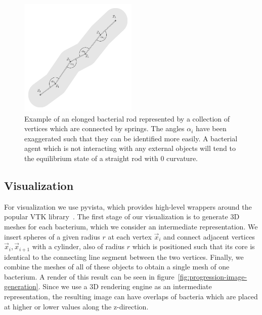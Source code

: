 \documentclass{article}
\begin{document}

\begin{figure}[H]
    \centering
    \includegraphics[width=0.5\textwidth]{docs/source/_static/mechanics.png}
    \caption{
        Example of an elonged bacterial rod represented by a collection of vertices which are
        connected by springs.
        The angles $\alpha_i$ have been exaggerated such that they can be identified more easily.
        A bacterial agent which is not interacting with any external objects will tend to the
        equilibrium state of a straight rod with $0$ curvature.
    }
    \label{fig:mechanics-bacterium}
\end{figure}

\subsection{Visualization}
\label{subsection:visualization}

For visualization we use pyvista, which provides high-level wrappers around the popular VTK
library~\cite{vtkBook,Sullivan2019}.
The first stage of our visualization is to generate 3D meshes for each bacterium, which we consider
an intermediate representation.
We insert spheres of a given radius $r$ at each vertex $\vec{x}_i$ and connect adjacent vertices
$\vec{x}_i,\vec{x}_{i+1}$ with a cylinder, also of radius $r$ which is positioned such that its core
is identical to the connecting line segment between the two vertices.
Finally, we combine the meshes of all of these objects to obtain a single mesh of one bacterium.
A render of this result can be seen in figure~\ref{fig:progression-image-generation}.
Since we use a 3D rendering engine as an intermediate representation, the resulting image can have
overlaps of bacteria which are placed at higher or lower values along the z-direction.
\end{document}
